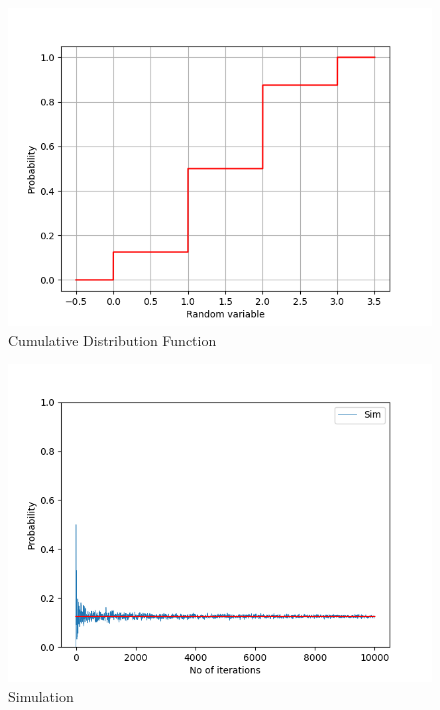 \documentclass[journal]{IEEEtran}
\begin{document}
\begin{figure}[h]
\centering
\includegraphics[width=\columnwidth]{figs/plot2.png}
\caption{Cumulative Distribution Function}
\label{fig:Plot1} 
\end{figure}

\begin{figure}[h]
\centering
\includegraphics[width=\columnwidth]{figs/sim.png}
\caption{Simulation}
\label{fig:Plot1} 
\end{figure}
\end{document}
